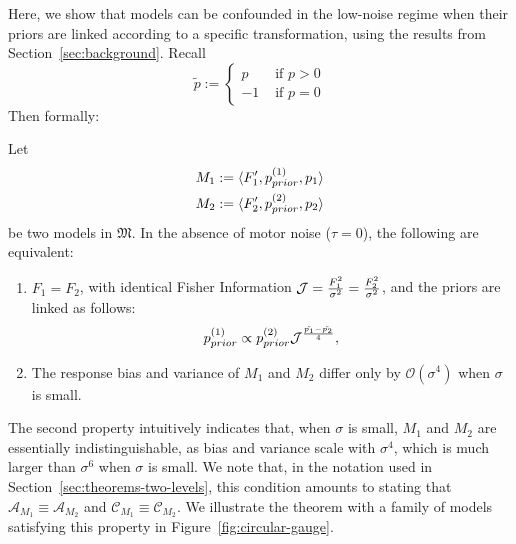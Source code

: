 Here, we show that models can be confounded in the low-noise regime when their priors are linked according to a specific transformation, using the results from Section~\ref{sec:background}.
Recall
\begin{equation}\label{eq:tilde-p-also2}
    \tilde{p} := \begin{cases} p &\text{ if } p > 0 \\ -1 & \text{ if } p=0\end{cases}
\end{equation}
Then formally:
\begin{thm}
Let 
\begin{align*}
    M_1 := \langle F'_1, p_{prior}^{(1)}, p_1 \rangle \\
    M_2 := \langle F'_2, p_{prior}^{(2)}, p_2 \rangle 
\end{align*}
be two models in $\mathfrak{M}$. In the absence of motor noise ($\tau=0$), the following are equivalent:
\begin{enumerate}
    \item $F_1 = F_2$, with identical Fisher Information $\mathcal{J} = \frac{F_1^2}{\sigma^2} = \frac{F_2^2}{\sigma^2}$, and the priors are linked as follows:
\begin{equation}\label{eq:prior-transformation}
    p_{prior}^{(1)} \propto p_{prior}^{(2)}  \mathcal{J}^{\frac{\tilde{p_1}-\tilde{p_2}}{4}},
\end{equation}
\item The response bias and variance of $M_1$ and $M_2$ differ only by $\mathcal{O}(\sigma^4)$ when $\sigma$ is small.
\end{enumerate}
\end{thm}
The second property intuitively indicates that, when $\sigma$ is small, $M_1$ and $M_2$ are essentially indistinguishable, as bias and variance scale with $\sigma^4$, which is much larger than $\sigma^6$ when $\sigma$ is small. We note that, in the notation used in Section~\ref{sec:theorems-two-levels}, this condition amounts to stating that $\mathcal{A}_{M_1} \equiv \mathcal{A}_{M_2}$ and $\mathcal{C}_{M_1} \equiv \mathcal{C}_{M_2}$.
We illustrate the theorem with a family of models satisfying this property in Figure~\ref{fig:circular-gauge}.
